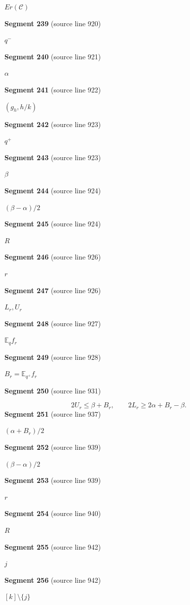 \documentclass[11pt]{article}
\begin{document}
\( Er(\mathcal C) \)\par
\textbf{Segment 239} (source line 920)\par
\( q^- \)\par
\textbf{Segment 240} (source line 921)\par
\( \alpha \)\par
\textbf{Segment 241} (source line 922)\par
\( (g_h,h/k) \)\par
\textbf{Segment 242} (source line 923)\par
\( q^+ \)\par
\textbf{Segment 243} (source line 923)\par
\( \beta \)\par
\textbf{Segment 244} (source line 924)\par
\( (\beta-\alpha)/2 \)\par
\textbf{Segment 245} (source line 924)\par
\( R \)\par
\textbf{Segment 246} (source line 926)\par
\( r \)\par
\textbf{Segment 247} (source line 926)\par
\( L_r,U_r \)\par
\textbf{Segment 248} (source line 927)\par
\( \mathbb E_qf_r \)\par
\textbf{Segment 249} (source line 928)\par
\( B_r=\mathbb E_{q^+}f_r \)\par
\textbf{Segment 250} (source line 931)\par
\[
2U_r\le\beta+B_r,\qquad
2L_r\ge2\alpha+B_r-\beta.
\tag{19}
\]
\textbf{Segment 251} (source line 937)\par
\( (\alpha+B_r)/2 \)\par
\textbf{Segment 252} (source line 939)\par
\( (\beta-\alpha)/2 \)\par
\textbf{Segment 253} (source line 939)\par
\( r \)\par
\textbf{Segment 254} (source line 940)\par
\( R \)\par
\textbf{Segment 255} (source line 942)\par
\( j \)\par
\textbf{Segment 256} (source line 942)\par
\( [k]\setminus\{j\} \)\par
\end{document}
